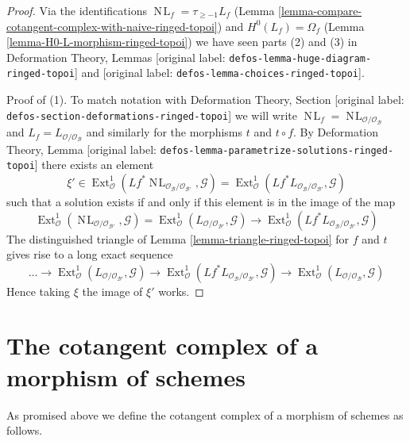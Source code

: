 \documentclass[10pt,a4paper]{article}
\theoremstyle{plain}
\theoremstyle{definition}
\theoremstyle{remark}
\numberwithin{equation}{subsection}
\def\Ext{\mathop{\mathrm{Ext}}\nolimits}
\def\NL{\mathop{N\!L}\nolimits}
\begin{document}
\begin{proof}
Via the identifications $\NL_f = \tau_{\geq -1}L_f$
(Lemma \ref{lemma-compare-cotangent-complex-with-naive-ringed-topoi}) and
$H^0(L_f) = \Omega_f$
(Lemma \ref{lemma-H0-L-morphism-ringed-topoi})
we have seen parts (2) and (3) in
Deformation Theory, Lemmas \textnormal{[original label: \nolinkurl{defos-lemma-huge-diagram-ringed-topoi}]} and
\textnormal{[original label: \nolinkurl{defos-lemma-choices-ringed-topoi}]}.

\medskip\noindent
Proof of (1). To match notation with Deformation Theory, Section
\textnormal{[original label: \nolinkurl{defos-section-deformations-ringed-topoi}]} we will write
$\NL_f = \NL_{\mathcal{O}/\mathcal{O}_\mathcal{B}}$ and
$L_f = L_{\mathcal{O}/\mathcal{O}_\mathcal{B}}$ and similarly
for the morphisms $t$ and $t \circ f$. By
Deformation Theory, Lemma \textnormal{[original label: \nolinkurl{defos-lemma-parametrize-solutions-ringed-topoi}]}
there exists an element
$$
\xi' \in
\Ext^1_\mathcal{O}(
Lf^*\NL_{\mathcal{O}_\mathcal{B}/\mathcal{O}_{\mathcal{B}'}}, \mathcal{G}) =
\Ext^1_\mathcal{O}(
Lf^*L_{\mathcal{O}_\mathcal{B}/\mathcal{O}_{\mathcal{B}'}}, \mathcal{G})
$$
such that a solution exists if and only if this element is in
the image of the map
$$
\Ext^1_\mathcal{O}(
\NL_{\mathcal{O}/\mathcal{O}_{\mathcal{B}'}}, \mathcal{G}) =
\Ext^1_\mathcal{O}(
L_{\mathcal{O}/\mathcal{O}_{\mathcal{B}'}}, \mathcal{G})
\longrightarrow
\Ext^1_\mathcal{O}(
Lf^*L_{\mathcal{O}_\mathcal{B}/\mathcal{O}_{\mathcal{B}'}}, \mathcal{G})
$$
The distinguished triangle of Lemma \ref{lemma-triangle-ringed-topoi}
for $f$ and $t$ gives rise to a long exact sequence
$$
\ldots \to
\Ext^1_\mathcal{O}(
L_{\mathcal{O}/\mathcal{O}_{\mathcal{B}'}}, \mathcal{G}) \to
\Ext^1_\mathcal{O}(
Lf^*L_{\mathcal{O}_\mathcal{B}/\mathcal{O}_{\mathcal{B}'}}, \mathcal{G})
\to
\Ext^1_\mathcal{O}(
L_{\mathcal{O}/\mathcal{O}_\mathcal{B}}, \mathcal{G})
$$
Hence taking $\xi$ the image of $\xi'$ works.
\end{proof}












\section{The cotangent complex of a morphism of schemes}
\label{section-cotangent-morphism-schemes}

\noindent
As promised above we define the cotangent complex of a morphism of
schemes as follows.
\end{document}
